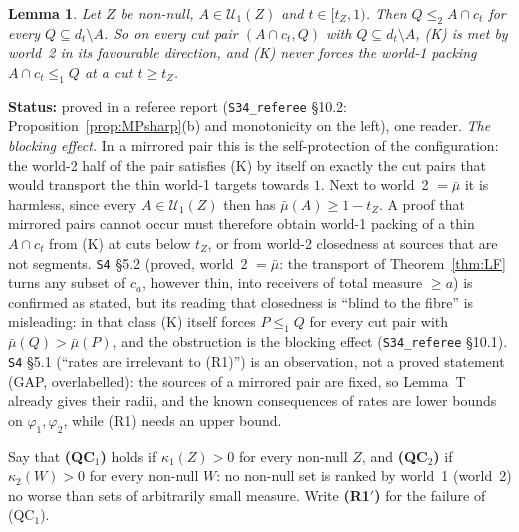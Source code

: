 \documentclass[11pt]{article}
\newtheorem{lemma}[theorem]{Lemma}
\theoremstyle{definition}
\theoremstyle{remark}
\newcommand{\src}[1]{\texttt{#1}}
\newcommand{\status}[1]{\par\smallskip\noindent\textbf{Status:} #1\par\smallskip}
\begin{document}
\begin{lemma}\label{lem:block}
Let $Z$ be non-null, $A\in\mathcal U_1(Z)$ and $t\in[t_Z,1)$. Then $Q\le_2A\cap c_t$ for every $Q\subseteq d_t\setminus A$. So on every cut pair $(A\cap c_t,Q)$ with $Q\subseteq d_t\setminus A$, (K) is met by world~2 in its favourable direction, and (K) never forces the world-1 packing $A\cap c_t\le_1Q$ at a cut $t\ge t_Z$.
\end{lemma}
\status{proved in a referee report (\src{S34\_referee} \S10.2: Proposition~\ref{prop:MPsharp}(b) and monotonicity on the left), one reader. \emph{The blocking effect.} In a mirrored pair this is the self-protection of the configuration: the world-2 half of the pair satisfies (K) by itself on exactly the cut pairs that would transport the thin world-1 targets towards $1$. Next to world~2 $=\bar\mu$ it is harmless, since every $A\in\mathcal U_1(Z)$ then has $\bar\mu(A)\ge1-t_Z$. A proof that mirrored pairs cannot occur must therefore obtain world-1 packing of a thin $A\cap c_t$ from (K) at cuts below $t_Z$, or from world-2 closedness at sources that are not segments. \src{S4} \S5.2 (proved, world~2 $=\bar\mu$: the transport of Theorem~\ref{thm:LF} turns any subset of $c_a$, however thin, into receivers of total measure $\ge a$) is confirmed as stated, but its reading that closedness is ``blind to the fibre'' is misleading: in that class (K) itself forces $P\le_1Q$ for every cut pair with $\bar\mu(Q)>\bar\mu(P)$, and the obstruction is the blocking effect (\src{S34\_referee} \S10.1). \src{S4} \S5.1 (``rates are irrelevant to (R1)'') is an observation, not a proved statement (GAP, overlabelled): the sources of a mirrored pair are fixed, so Lemma~T already gives their radii, and the known consequences of rates are lower bounds on $\varphi_1,\varphi_2$, while (R1) needs an upper bound.}

Say that \textbf{(QC$_1$)} holds if $\kappa_1(Z)>0$ for every non-null $Z$, and \textbf{(QC$_2$)} if $\kappa_2(W)>0$ for every non-null $W$: no non-null set is ranked by world~1 (world~2) no worse than sets of arbitrarily small measure. Write \textbf{(R1$'$)} for the failure of (QC$_1$).
\end{document}
